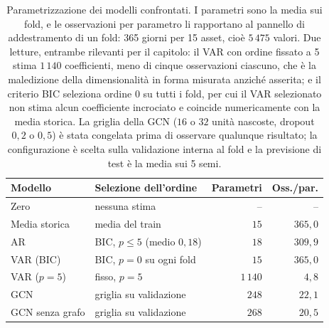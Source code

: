 \begin{table}[H]
\centering
\caption[Parametrizzazione dei modelli]{Parametrizzazione dei modelli confrontati. I parametri sono la media sui fold, e le osservazioni per parametro li rapportano al pannello di addestramento di un fold: 365 giorni per 15 asset, cioè $5\,475$ valori. Due letture, entrambe rilevanti per il capitolo: il VAR con ordine fissato a 5 stima $1\,140$ coefficienti, meno di cinque osservazioni ciascuno, che è la maledizione della dimensionalità in forma misurata anziché asserita; e il criterio BIC seleziona ordine $0$ su tutti i fold, per cui il VAR selezionato non stima alcun coefficiente incrociato e coincide numericamente con la media storica. La griglia della GCN ($16$ o $32$ unità nascoste, dropout $0{,}2$ o $0{,}5$) è stata congelata prima di osservare qualunque risultato; la configurazione è scelta sulla validazione interna al fold e la previsione di test è la media sui 5 semi.}
\label{tab:models}
\begin{tabular}{@{}llrr@{}}
\toprule
\textbf{Modello} & \textbf{Selezione dell'ordine} & \textbf{Parametri} & \textbf{Oss./par.} \\
\midrule
Zero & nessuna stima & -- & -- \\
Media storica & media del train & $15$ & $365{,}0$ \\
AR & BIC, $p \leq 5$ (medio $0{,}18$) & $18$ & $309{,}9$ \\
VAR (BIC) & BIC, $p = 0$ su ogni fold & $15$ & $365{,}0$ \\
VAR ($p=5$) & fisso, $p = 5$ & $1\,140$ & $4{,}8$ \\
GCN & griglia su validazione & $248$ & $22{,}1$ \\
GCN senza grafo & griglia su validazione & $268$ & $20{,}5$ \\
\bottomrule
\end{tabular}
\end{table}
